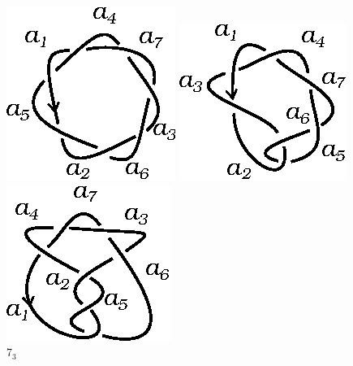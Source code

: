 \documentclass[graybox]{svmult}
\begin{document}
	\begin{figure}[ht]
		\centering
		\begin{minipage}{0.3\textwidth}
			\centering
			\includegraphics[scale=0.6]{images/7_1}
			\caption{$7_1$}
			\label{fig:7_1}

		\end{minipage}
		\begin{minipage}{0.3\textwidth}
			\centering
			\includegraphics[scale=0.6]{images/7_2}
			\caption{$7_2$}
			\label{fig:7_2}

		\end{minipage}
		\begin{minipage}{0.3\textwidth}
			\centering
			\includegraphics[scale=0.6]{images/7_3}
			\caption{$7_3$}
			\label{fig:7_3}
		\end{minipage}
	\end{figure}
\end{document}
